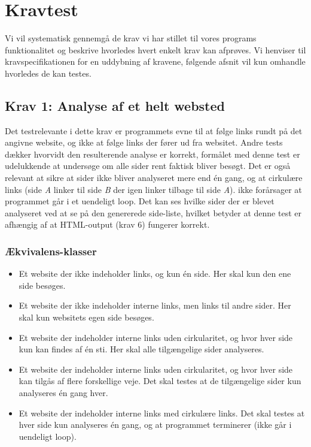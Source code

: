 \documentclass[a4paper,oneside,article, titlepage]{memoir}
\begin{document}
\chapter{Kravtest}

Vi vil systematisk gennemgå de krav vi har stillet til vores programs
funktionalitet og beskrive hvorledes hvert enkelt krav kan
afprøves. Vi henviser til kravspecifikationen for en uddybning af
kravene, følgende afsnit vil kun omhandle hvorledes de kan testes.

\section*{Krav 1: Analyse af et helt websted}

Det testrelevante i dette krav er programmets evne til at følge links
rundt på det angivne website, og ikke at følge links der fører ud fra
websitet. Andre tests dækker hvorvidt den resulterende analyse er
korrekt, formålet med denne test er udelukkende at undersøge om alle
sider rent faktisk bliver besøgt. Det er også relevant at sikre at
sider ikke bliver analyseret mere end én gang, og at cirkulære links
(side \textit{A} linker til side \textit{B} der igen linker tilbage
til side \textit{A}). ikke forårsager at programmet går i et uendeligt
loop. Det kan ses hvilke sider der er blevet analyseret ved at se på
den genererede side-liste, hvilket betyder at denne test er afhængig
af at HTML-output (krav 6) fungerer korrekt.

\subsection{Ækvivalens-klasser}
\begin{itemize}
\item Et website der ikke indeholder links, og kun én side. Her skal
  kun den ene side besøges.
\item Et website der ikke indeholder interne links, men links til
  andre sider. Her skal kun websitets egen side besøges.
\item Et website der indeholder interne links uden cirkularitet, og
  hvor hver side kun kan findes af én sti. Her skal alle tilgængelige
  sider analyseres.
\item Et website der indeholder interne links uden cirkularitet, og
  hvor hver side kan tilgås af flere forskellige veje. Det skal testes
  at de tilgængelige sider kun analyseres én gang hver.
\item Et website der indeholder interne links med cirkulære links. Det
  skal testes at hver side kun analyseres én gang, og at programmet
  terminerer (ikke går i uendeligt loop).
\end{itemize}
\end{document}
